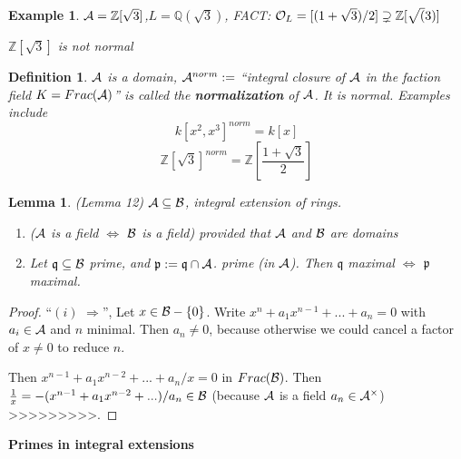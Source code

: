 \documentclass[11pt]{article}
\newtheorem{lemma}[thm]{Lemma}
\newtheorem{dfn}[thm]{Definition}
\newtheorem{ex}[thm]{Example}
\newcommand{\intg}{\mathbb Z}
\newcommand{\ratl}{\mathbb Q}
\newcommand{\scp}{{\mathfrak p}}
\newcommand{\scq}{\mathfrak q}
\newcommand{\cala}{{\cal A}}
\newcommand{\calb}{{\cal B}}
\newcommand{\calo}{{\cal O}}
\newcommand{\Lrta}{\Longrightarrow}
\newcommand{\Llrta}{\Longleftrightarrow}
\begin{document}
\begin{ex}
$\cala=\intg[\sqrt{3}]$,$L=\ratl(\sqrt{3})$,
FACT: $\calo_L=[(1+\sqrt{3})/2]\supsetneq \intg[\sqrt(3)]$

$\intg[\sqrt{3}]$ is not normal
\end{ex}

\begin{dfn}
$\cala$ is a domain, $\cala^{norm}:=$ ``integral closure of  $\cala$ in the faction field $K=Frac(\cala)$'' is called the \textbf{normalization} of $\cala$. It is normal.
Examples include
$$
k[x^2,x^3]^{norm}=k[x]
$$
$$
\intg[\sqrt{3}]^{norm}=\intg\left[\frac{1+\sqrt{3}}{2}\right]
$$
\end{dfn}
\begin{lemma}(Lemma 12)
$\cala\subseteq \calb$, integral extension of rings.
\begin{enumerate}[label=(\roman*)]
\item ($\cala$ is a field $\Llrta$ $\calb$ is a field) provided that $\cala$ and $\calb$ are domains
\item  Let $\scq\subseteq \calb$ prime, and $\scp:=\scq\cap \cala$. prime (in $\cala$). Then 
$\scq$ maximal $\Llrta$ $\scp$ maximal.
\end{enumerate}
\end{lemma}
\begin{proof}
``$(i)$ $\Lrta$'', Let $x\in \calb-\{0\}$. Write $x^n+a_1 x^{n-1}+...+a_n=0$ with $a_i\in\cala$ and $n$ minimal. Then $a_n\neq 0$, because otherwise we could cancel a factor of $x\neq 0$ to reduce $n$.

Then $x^{n-1}+a_1 x^{n-2}+...+a_n/x=0$ in $Frac(\calb)$. Then $\frac{1}{x}=-(x^{n-1}+a_1 x^{n-2}+...)/a_n\in \calb$ (because $\cala$ is a field $a_n\in\cala^\times$)
>>>>>>>>>.
\end{proof}

\textbf{Primes in integral extensions}
\end{document}
